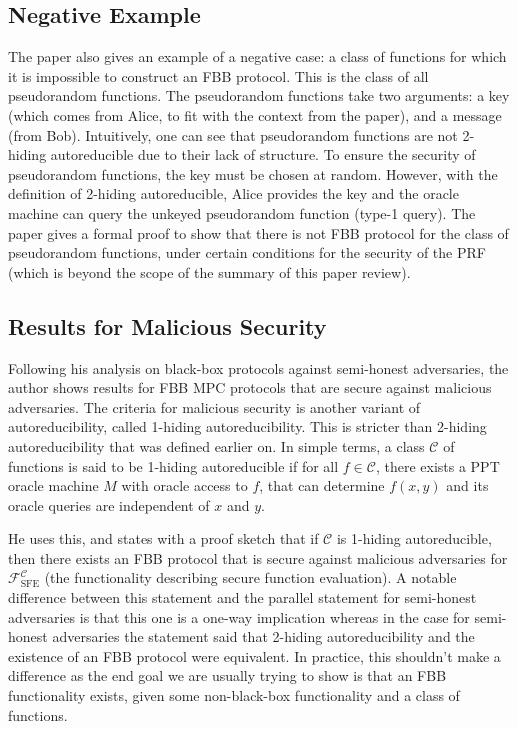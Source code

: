 \documentclass[11pt]{article}
\theoremstyle{theorem}
\theoremstyle{theorem}
\theoremstyle{remark}
\theoremstyle{note}
\theoremstyle{plain}
\theoremstyle{definition}
\begin{document}
\subsection{Negative Example}
The paper also gives an example of a negative case: a class of functions for which it is impossible to construct an FBB protocol. This is the class of all pseudorandom functions. The pseudorandom functions take two arguments: a key (which comes from Alice, to fit with the context from the paper), and a message (from Bob). Intuitively, one can see that pseudorandom functions are not 2-hiding autoreducible due to their lack of structure. To ensure the security of pseudorandom functions, the key must be chosen at random. However, with the definition of 2-hiding autoreducible, Alice provides the key and the oracle machine can query the unkeyed pseudorandom function (type-1 query). The paper gives a formal proof to show that there is not FBB protocol for the class of pseudorandom functions, under certain conditions for the security of the PRF (which is beyond the scope of the summary of this paper review).

\subsection{Results for Malicious Security}
Following his analysis on black-box protocols against semi-honest adversaries, the author shows results for FBB MPC protocols that are secure against malicious adversaries. The criteria for malicious security is another variant of autoreducibility, called 1-hiding autoreducibility. This is stricter than 2-hiding autoreducibility that was defined earlier on. In simple terms, a class $\mathcal{C}$ of functions is said to be 1-hiding autoreducible if for all $f \in \mathcal{C}$, there exists a PPT oracle machine $M$ with oracle access to $f$, that can determine $f(x, y)$ and its oracle queries are independent of $x$ and $y$.

He uses this, and states with a proof sketch that if $\mathcal{C}$ is 1-hiding autoreducible, then there exists an FBB protocol that is secure against malicious adversaries for $\mathcal{F}^\mathcal{C}_\text{SFE}$ (the functionality describing secure function evaluation). A notable difference between this statement and the parallel statement for semi-honest adversaries is that this one is a one-way implication whereas in the case for semi-honest adversaries the statement said that 2-hiding autoreducibility and the existence of an FBB protocol were equivalent. In practice, this shouldn't make a difference as the end goal we are usually trying to show is that an FBB functionality exists, given some non-black-box functionality and a class of functions.
\end{document}

